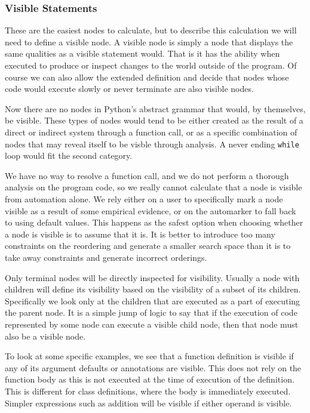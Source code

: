 \documentclass{report}
\begin{document}
\subsubsection{Visible Statements}

These are the easiest nodes to calculate, but to describe this calculation we will need to define a visible node. A visible node is simply a node
that displays the same qualities as a visible statement would. That is it has the ability when executed to produce or inspect changes to the world
outside of the program. Of course we can also allow the extended definition and decide that nodes whose code would execute slowly or never terminate
are also visible nodes.

Now there are no nodes in Python's abstract grammar that would, by themselves, be visible. These types of nodes would tend to be either created as the
result of a direct or indirect system through a function call, or as a specific combination of nodes that may reveal itself to be visble through analysis.
A never ending \texttt{while} loop would fit the second category.

We have no way to resolve a function call, and we do not perform a thorough analysis on the program code, so we really cannot calculate that a node is
visible from automation alone. We rely either on a user to specifically mark a node visible as a result of some empirical evidence, or on the automarker
to fall back to using default values. This happens as the safest option when choosing whether a node is visible is to assume that it is. It is better to
introduce too many constraints on the reordering and generate a smaller search space than it is to take away constraints and generate incorrect orderings.

Only terminal nodes will be directly inspected for visibility. Usually a node with children will define its visibility based on the visibility of a subset
of its children. Specifically we look only at the children that are executed as a part of executing the parent node. It is a simple jump of logic to say
that if the execution of code represented by some node can execute a visible child node, then that node must also be a visible node.

To look at some specific examples, we see that a function definition is visible if any of its argument defaults or annotations are visible. This does not
rely on the function body as this is not executed at the time of execution of the definition. This is different for class definitions, where the body is
immediately executed. Simpler expressions such as addition will be visible if either operand is visible.
\end{document}
